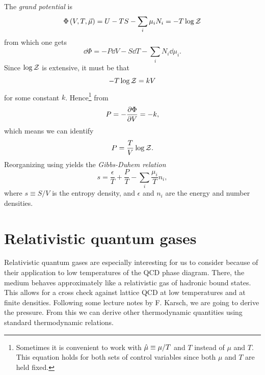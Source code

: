 The {\it grand potential} is
\begin{equation}\label{eq:grand}
  \Phi\left(V,T,\vec{\mu}\right)=U-TS-\sum_i\mu_i N_i=-T\log\mathcal{Z}
\end{equation}
from which one gets
\begin{equation}\label{eq:1stlawgrand}
  \dd\Phi=-P\dd V-S\dd T-\sum_i N_i\dd\mu_i.
\end{equation}
Since $\log\mathcal{Z}$ is extensive, it must be that
\begin{equation}
-T\log\mathcal{Z}=kV
\end{equation}
for some constant $k$. Hence\footnote{Sometimes it is convenient to work
with $\hat{\mu}\equiv\mu/T$ and $T$ instead of $\mu$ and $T$. This equation
holds for both sets of control variables since both $\mu$ and $T$ are
held fixed.} from 
\begin{equation}
P=-\pdv{\Phi}{V}=-k,
\end{equation}
which means we can identify
\begin{equation}\label{eq:pgrand}
P=\frac{T}{V}\log\mathcal{Z}.
\end{equation}
Reorganizing  using 
yields the {\it Gibbs-Duhem relation}
\begin{equation}
  s=\frac{\epsilon}{T}+\frac{P}{T}-\sum_i\frac{\mu_i}{T}n_i,
\end{equation}
where $s\equiv S/V$ is the entropy density, and $\epsilon$ and $n_i$
are the energy and number densities.

\section{Relativistic quantum gases}

Relativistic quantum gases are especially interesting for us
to consider because of their
application to low temperatures of the QCD phase diagram. There, the medium
behaves approximately like a relativistic gas of hadronic bound states.
This allows for a cross check against lattice QCD at low temperatures
and at finite densities. Following some lecture notes by F. Karsch,
we are going to derive the
pressure. From this we can derive other thermodynamic quantities
using standard thermodynamic relations.


